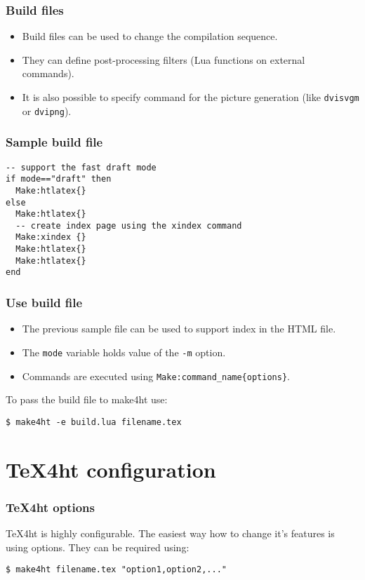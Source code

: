 \documentclass{beamer}
\begin{document}
\begin{frame}[fragile]
\frametitle{Build files}
\begin{itemize}
  \item Build files can be used to change the compilation sequence.
  \item They can define post-processing filters (Lua functions on external commands).
  \item It is also possible to specify command for the picture generation (like \texttt{dvisvgm} or \texttt{dvipng}).
\end{itemize}
\end{frame}

\begin{frame}[fragile]
  \frametitle{Sample build file}
\begin{verbatim}
-- support the fast draft mode
if mode=="draft" then
  Make:htlatex{}
else
  Make:htlatex{}
  -- create index page using the xindex command
  Make:xindex {}
  Make:htlatex{}
  Make:htlatex{}
end
\end{verbatim}
\end{frame}

\begin{frame}[fragile]
  \frametitle{Use build file}
  \begin{itemize}
    \item The previous sample file can be used to support index in the HTML file.
    \item The \texttt{mode} variable holds value of the \texttt{-m} option.
    \item Commands are executed using \verb|Make:command_name{options}|.
  \end{itemize}

  To pass the build file to make4ht use:

\begin{verbatim}
$ make4ht -e build.lua filename.tex
\end{verbatim}
\end{frame}

\section{\TeX4ht configuration}

\begin{frame}[fragile]
  \frametitle{\TeX4ht options}
\TeX4ht is highly configurable. The easiest way how to change it's features is using options. They can be 
required using:
\begin{verbatim}
$ make4ht filename.tex "option1,option2,..."
\end{verbatim}

\end{frame}
\end{document}
